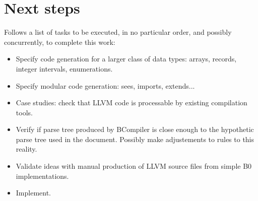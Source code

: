 \documentclass{article}
\begin{document}
\section{Next steps}

Follows a list of tasks to be executed, in no particular order,
and possibly concurrently, to complete this work:
\begin{itemize}

\item Specify code generation for a larger class of data types: arrays,
records, integer intervals, enumerations.

\item Specify modular code generation: sees, imports, extends...

\item Case studies: check that LLVM code is processable by existing
compilation tools.

\item Verify if parse tree produced by BCompiler is close enough to 
  the hypothetic parse tree used in the document. Possibly make adjustements
  to rules to this reality.

\item Validate ideas with manual production of LLVM source files from
simple B0 implementations.

\item Implement.

\end{itemize}
\end{document}
